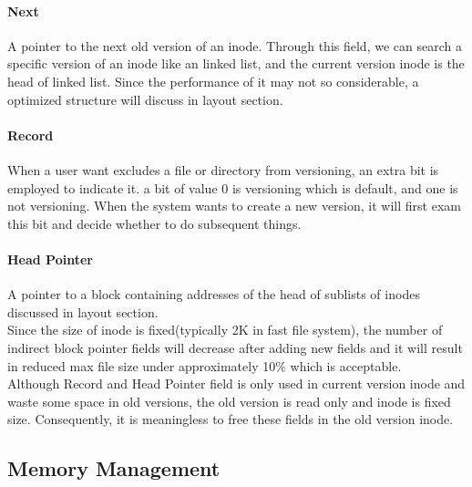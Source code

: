 \paragraph{Next}A pointer to the next old version of an inode. Through this field, we can search a specific version of an inode like an linked list, and the current version inode is the head of linked list. Since the performance of it may not so considerable, a optimized structure will discuss in layout section.
\paragraph{Record}When a user want excludes a file or directory from versioning, an extra bit is employed to indicate it. a bit of value 0 is versioning which is default, and one is not versioning. When the system wants to create a new version, it will first exam this bit and decide whether to do subsequent things.
\paragraph{Head Pointer}A pointer to a block containing addresses of the head of sublists of inodes discussed in layout section. \\[1em]
Since the size of inode  is fixed(typically 2K in fast file system), the number of indirect block pointer fields will decrease after adding new fields and it will result in reduced max file size under approximately 10\% which is acceptable.\\[1em]
Although Record and Head Pointer field is only used in current version inode and waste some space in old versions, the old version is read only and inode is fixed size. Consequently, it is meaningless to free these fields in the old version inode.
\subsection{Memory Management}
